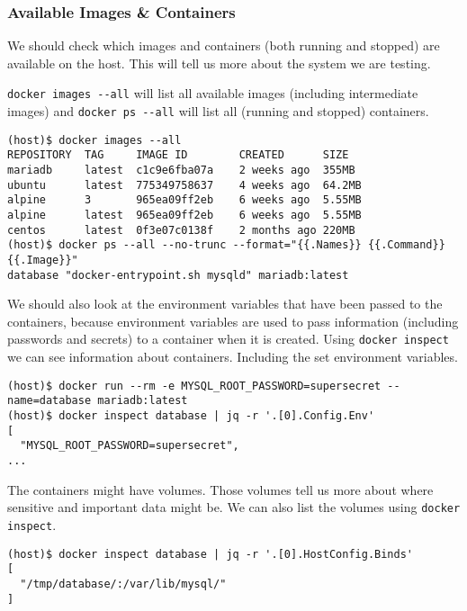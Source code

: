 \subsubsection{Available Images \& Containers}
We should check which images and containers (both running and stopped) are available on the host. This will tell us more about the system we are testing.

\lstinline{docker images --all} will list all available images (including intermediate images) and \lstinline{docker ps --all} will list all (running and stopped) containers.

\begin{lstlisting}[caption={Listing all images and containers available},captionpos=b]
(host)$ docker images --all
REPOSITORY  TAG     IMAGE ID        CREATED      SIZE
mariadb     latest  c1c9e6fba07a    2 weeks ago  355MB
ubuntu      latest  775349758637    4 weeks ago  64.2MB
alpine      3       965ea09ff2eb    6 weeks ago  5.55MB
alpine      latest  965ea09ff2eb    6 weeks ago  5.55MB
centos      latest  0f3e07c0138f    2 months ago 220MB
(host)$ docker ps --all --no-trunc --format="{{.Names}} {{.Command}} {{.Image}}"
database "docker-entrypoint.sh mysqld" mariadb:latest
\end{lstlisting}

\hfill

We should also look at the environment variables that have been passed to the containers, because environment variables are used to pass information (including passwords and secrets) to a container when it is created. Using \lstinline{docker inspect} we can see information about containers. Including the set environment variables.
\begin{lstlisting}[caption={List environment variables passed to Docker container},captionpos=b]
(host)$ docker run --rm -e MYSQL_ROOT_PASSWORD=supersecret --name=database mariadb:latest
(host)$ docker inspect database | jq -r '.[0].Config.Env'
[
  "MYSQL_ROOT_PASSWORD=supersecret",
...
\end{lstlisting}

\hfill

The containers might have volumes. Those volumes tell us more about where sensitive and important data might be. We can also list the volumes using \lstinline{docker inspect}.
\begin{lstlisting}[caption={List bindmounts into Docker container.},captionpos=b]
(host)$ docker inspect database | jq -r '.[0].HostConfig.Binds'
[
  "/tmp/database/:/var/lib/mysql/"
]
\end{lstlisting}
